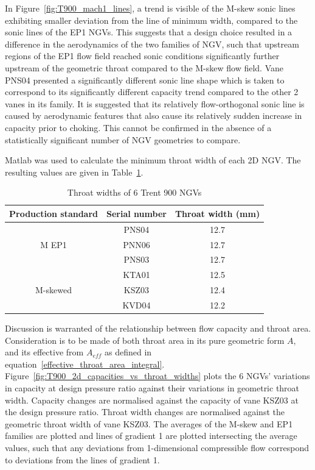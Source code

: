 \documentclass[a4paper, 11pt, oneside]{report}
\begin{document}
In Figure~\ref{fig:T900_mach1_lines}, a trend is visible of the M-skew sonic lines exhibiting smaller deviation from the line of minimum width, compared to the sonic lines of the EP1 NGVs. This suggests that a design choice resulted in a difference in the aerodynamics of the two families of NGV, such that upstream regions of the EP1 flow field reached sonic conditions significantly further upstream of the geometric throat compared to the M-skew flow field. Vane PNS04 presented a significantly different sonic line shape which is taken to correspond to its significantly different capacity trend compared to the other 2 vanes in its family. It is suggested that its relatively flow-orthogonal sonic line is caused by aerodynamic features that also cause its relatively sudden increase in capacity prior to choking. This cannot be confirmed in the absence of a statistically significant number of NGV geometries to compare.

Matlab was used to calculate the minimum throat width of each 2D NGV. The resulting values are given in Table~\ref{T900_throat_widths}.

\begin{table}[H]
\caption{Throat widths of 6 Trent 900 NGVs}
\label{T900_throat_widths}
\begin{center}
\begin{tabular}{|c|c|c|}
\hline
Production standard & Serial number & Throat width (mm)\\
\hline
\multirow{3}{*}{M EP1} & PNS04 & 12.7\\
 & PNN06 & 12.7\\
 & PNS03 & 12.7\\
\hline
\multirow{3}{*}{M-skewed} & KTA01 & 12.5\\
 & KSZ03 & 12.4\\
 & KVD04 & 12.2\\
\hline
\end{tabular}
\end{center}
\end{table}

\newpage
Discussion is warranted of the relationship between flow capacity and throat area. Consideration is to be made of both throat area in its pure geometric form $A$, and its effective from $A_{eff}$ as defined in equation~\ref{effective_throat_area_integral}. Figure~\ref{fig:T900_2d_capacities_vs_throat_widths} plots the 6 NGVs' variations in capacity at design pressure ratio against their variations in geometric throat width. Capacity changes are normalised against the capacity of vane KSZ03 at the design pressure ratio. Throat width changes are normalised against the geometric throat width of vane KSZ03. The averages of the M-skew and EP1 families are plotted and lines of gradient 1 are plotted intersecting the average values, such that any deviations from 1-dimensional compressible flow correspond to deviations from the lines of gradient 1.
\end{document}
